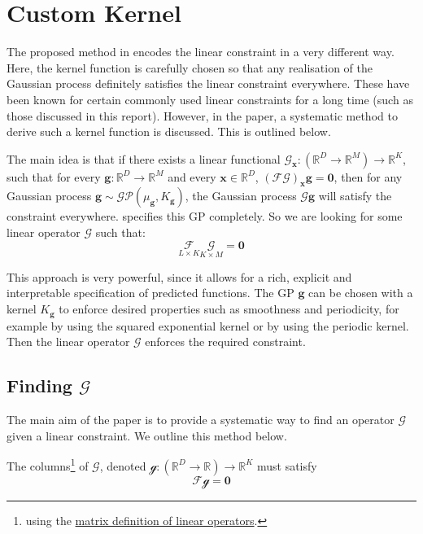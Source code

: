 \documentclass[12pt,a4paper,twoside]{report}
\theoremstyle{definition}
\newcommand{\g}{\mathscr G_\mathbf x}
\begin{document}
\section{Custom Kernel}\label{custom}
The proposed method in \cite{Jidling} encodes the linear constraint in a very different way. Here, the kernel function is carefully chosen so that any realisation of the Gaussian process definitely satisfies the linear constraint everywhere. These have been known for certain commonly used linear constraints for a long time (such as those discussed in this report). However, in the paper, a systematic method to derive such a kernel function is discussed. This is outlined below.

The main idea is that if there exists a linear functional $\g:(\mathbb{R}^{D}\to\mathbb{R}^M)\to \mathbb{R}^K$, such that for every $\mathbf g:\mathbb{R}^D\to\mathbb{R}^M$ and every $\mathbf x\in \mathbb{R}^D$, $(\mathscr F\mathscr G)_\mathbf x\mathbf g=\mathbf 0$, then for any Gaussian process $\mathbf g\sim \mathcal {GP}(\mu_\mathbf g, K_\mathbf g)$, the Gaussian process $\mathscr G\mathbf g$ will satisfy the constraint everywhere.  specifies this GP completely. So we are looking for some linear operator $\mathscr G$ such that:
\begin{equation}\label{constraint}
	\underset{L\times K}{\mathscr F}\underset{K\times M}{\mathscr G}=\mathbf 0
\end{equation}

This approach is very powerful, since it allows for a rich, explicit and interpretable specification of predicted functions.
The GP $\mathbf g$ can be chosen with a kernel $K_\mathbf g$ to enforce desired properties such as smoothness and periodicity, for example by using the squared exponential kernel or by using the periodic kernel. Then the linear operator $\mathscr G$ enforces the required constraint.

\subsection{\texorpdfstring{Finding $\mathscr G$}{Finding the operator G}}\label{findingG}
The main aim of the paper is to provide a systematic way to find an operator $\mathscr G$ given a linear constraint. We outline this method below.

The columns\footnote{using the \hyperref[matrix]{matrix definition of linear operators}.} of $\mathscr G$, denoted $\mathscr g:(\mathbb{R}^D\to\mathbb{R})\to\mathbb{R}^K$ must satisfy 
\begin{equation}\label{Fg0}
	\mathscr F \mathscr g = \mathbf 0
\end{equation}
\end{document}
